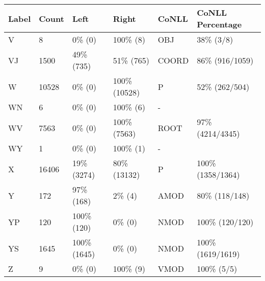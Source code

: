 \begin{figure*}
\begin{tabular}{|l|l|l|l||l|l|}
\hline
Label & Count & Left & Right & CoNLL & CoNLL Percentage\\ 
\hline
 V & 8 & 0\% (0) & 100\% (8) & OBJ & 38\% (3/8) \\ 
\hline
 VJ & 1500 & 49\% (735) & 51\% (765) & COORD & 86\% (916/1059) \\ 
\hline
 W & 10528 & 0\% (0) & 100\% (10528) & P & 52\% (262/504) \\ 
\hline
 WN & 6 & 0\% (0) & 100\% (6) & - &  \\ 
\hline
 WV & 7563 & 0\% (0) & 100\% (7563) & ROOT & 97\% (4214/4345) \\ 
\hline
 WY & 1 & 0\% (0) & 100\% (1) & - &  \\ 
\hline
 X & 16406 & 19\% (3274) & 80\% (13132) & P & 100\% (1358/1364) \\ 
\hline
 Y & 172 & 97\% (168) & 2\% (4) & AMOD & 80\% (118/148) \\ 
\hline
 YP & 120 & 100\% (120) & 0\% (0) & NMOD & 100\% (120/120) \\ 
\hline
 YS & 1645 & 100\% (1645) & 0\% (0) & NMOD & 100\% (1619/1619) \\ 
\hline
 Z & 9 & 0\% (0) & 100\% (9) & VMOD & 100\% (5/5) \\ 
\hline
\end{tabular}
\end{figure*}
